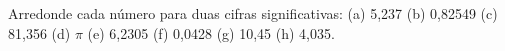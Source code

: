 Arredonde cada número para duas cifras significativas: (a) 5,237 (b) 0,82549 (c) 81,356 (d) $\pi$ (e) 6,2305 (f) 0,0428 (g) 10,45 (h) 4,035.

